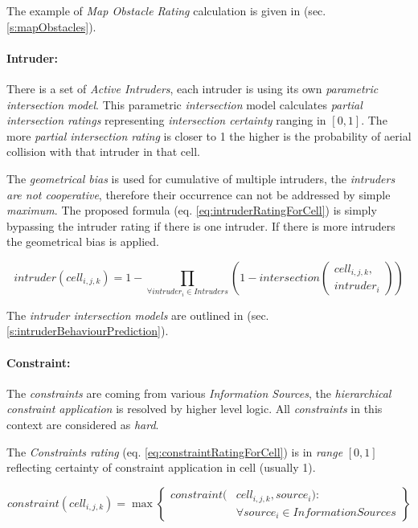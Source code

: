 \noindent The example of \emph{Map Obstacle Rating} calculation is given in (sec. \ref{s:mapObstacles}).


\paragraph{Intruder:} There is a set of \emph{Active Intruders}, each intruder is using its own \emph{parametric intersection model}. This parametric \emph{intersection} model calculates \emph{partial intersection ratings} representing \emph{intersection certainty} ranging in $[0,1]$. The more \emph{partial intersection rating} is closer to 1 the higher is the probability of aerial collision with that intruder in that cell. 

The \emph{geometrical bias} is used for cumulative of multiple intruders, the \emph{intruders are not cooperative}, therefore their occurrence can not be addressed by simple \emph{maximum}. The proposed formula (eq. \ref{eq:intruderRatingForCell}) is simply bypassing the intruder rating if there is one intruder. If there  is more intruders the geometrical bias is applied.


\begin{equation}\label{eq:intruderRatingForCell}
    intruder(cell_{i,j,k}) = 1 - \prod_{\forall intruder_i \in Intruders} \left(1- intersection\left(\begin{gathered}cell_{i,j,k},\\intruder_i\end{gathered}\right)\right)
\end{equation}

\noindent The \emph{intruder intersection models} are outlined in (sec. \ref{s:intruderBehaviourPrediction}). 

\paragraph{Constraint:} The \emph{constraints} are coming from various \emph{Information Sources}, the \emph{hierarchical constraint application} is resolved by higher level logic. All \emph{constraints} in this context are considered as \emph{hard}.

The \emph{Constraints rating} (eq. \ref{eq:constraintRatingForCell}) is in \emph{range} $[0,1]$ reflecting certainty of constraint application in cell (usually 1).

\begin{equation}\label{eq:constraintRatingForCell}
    constraint(cell_{i,j,k}) = \max \left\{\begin{aligned}constraint(&cell_{i,j,k},source_i):\\&\forall source_i \in InformationSources\end{aligned}\right\}
\end{equation}

